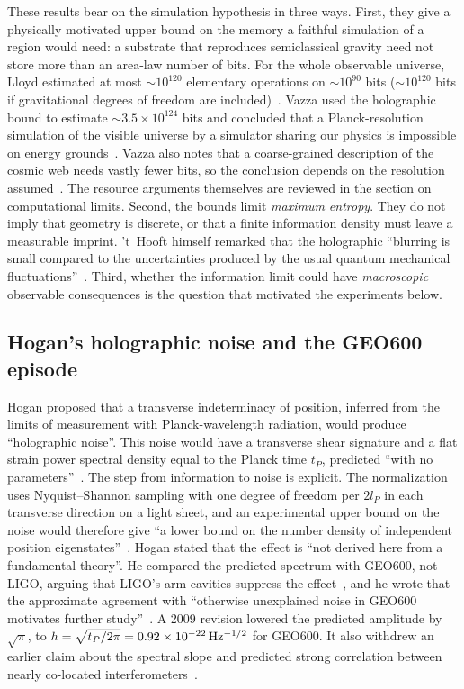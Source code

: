 These results bear on the simulation hypothesis in three ways. First, they give
a physically motivated upper bound on the memory a faithful simulation of a
region would need: a substrate that reproduces semiclassical gravity need not
store more than an area-law number of bits. For the whole observable universe,
Lloyd estimated at most $\sim10^{120}$ elementary operations on $\sim10^{90}$
bits ($\sim10^{120}$ bits if gravitational degrees of freedom are
included)~\cite{Lloyd2002computational}. Vazza used the holographic bound to
estimate $\sim3.5\times10^{124}$ bits and concluded that a Planck-resolution
simulation of the visible universe by a simulator sharing our physics is
impossible on energy grounds~\cite{Vazza2025astrophysical}. Vazza also notes
that a coarse-grained description of the cosmic web needs vastly fewer bits, so
the conclusion depends on the resolution assumed~\cite{Vazza2025astrophysical}.
The resource arguments themselves are reviewed in the section on computational limits.
Second, the bounds limit \emph{maximum entropy}. They do not imply that geometry
is discrete, or that a finite information density must leave a measurable
imprint. 't~Hooft himself remarked that the holographic ``blurring is small
compared to the uncertainties produced by the usual quantum mechanical
fluctuations''~\cite{tHooft1993dimensional}. Third, whether the information
limit could have \emph{macroscopic} observable consequences is the question that
motivated the experiments below.

\subsection{Hogan's holographic noise and the GEO600 episode}

Hogan proposed that a transverse indeterminacy of position, inferred from the
limits of measurement with Planck-wavelength radiation, would produce
``holographic noise''. This noise would have a transverse shear signature and a
flat strain power spectral density equal to the Planck time $t_P$, predicted
``with no parameters''~\cite{Hogan2008measurement}. The step from information to
noise is explicit. The normalization uses Nyquist--Shannon sampling with one
degree of freedom per $2l_P$ in each transverse direction on a light sheet, and
an experimental upper bound on the noise would therefore give ``a lower bound on
the number density of independent position eigenstates''~\cite{Hogan2008measurement}.
Hogan stated that the effect is ``not derived here from a fundamental theory''.
He compared the predicted spectrum with GEO600, not LIGO, arguing that LIGO's
arm cavities suppress the effect~\cite{Hogan2008measurement}, and he wrote that
the approximate agreement with ``otherwise unexplained noise in GEO600 motivates
further study''~\cite{Hogan2008measurement,Hogan2008indeterminacy}. A 2009
revision lowered the predicted amplitude by $\sqrt{\pi}$, to
$h=\sqrt{t_P/2\pi}=0.92\times10^{-22}\,{\rm Hz^{-1/2}}$ for GEO600. It also
withdrew an earlier claim about the spectral slope and predicted strong
correlation between nearly co-located interferometers~\cite{Hogan2009holographic}.

